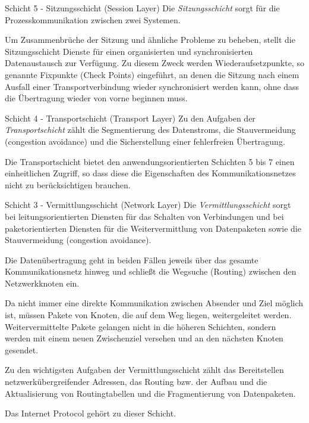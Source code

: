 \begin{defi}{Schicht 5 - Sitzungsschicht (Session Layer)}
    Die \emph{Sitzungsschicht} sorgt für die Prozesskommunikation zwischen zwei Systemen.

    Um Zusammenbrüche der Sitzung und ähnliche Probleme zu beheben, stellt die Sitzungsschicht Dienste für einen organisierten und synchronisierten Datenaustausch zur Verfügung.
    Zu diesem Zweck werden Wiederaufsetzpunkte, so genannte Fixpunkte (Check Points) eingeführt, an denen die Sitzung nach einem Ausfall einer Transportverbindung wieder synchronisiert werden kann, ohne dass die Übertragung wieder von vorne beginnen muss.
\end{defi}

\begin{defi}{Schicht 4 - Transportschicht (Transport Layer)}
    Zu den Aufgaben der \emph{Transportschicht} zählt die Segmentierung des Datenstroms, die Stauvermeidung (congestion avoidance) und die Sicherstellung einer fehlerfreien Übertragung.

    Die Transportschicht bietet den anwendungsorientierten Schichten 5 bis 7 einen einheitlichen Zugriff, so dass diese die Eigenschaften des Kommunikationsnetzes nicht zu berücksichtigen brauchen.
\end{defi}

\begin{defi}{Schicht 3 - Vermittlungsschicht (Network Layer)}
    Die \emph{Vermittlungsschicht} sorgt bei leitungsorientierten Diensten für das Schalten von Verbindungen und bei paketorientierten Diensten für die Weitervermittlung von Datenpaketen sowie die Stauvermeidung (congestion avoidance).

    Die Datenübertragung geht in beiden Fällen jeweils über das gesamte Kommunikationsnetz hinweg und schließt die Wegsuche (Routing) zwischen den Netzwerkknoten ein.

    Da nicht immer eine direkte Kommunikation zwischen Absender und Ziel möglich ist, müssen Pakete von Knoten, die auf dem Weg liegen, weitergeleitet werden.
    Weitervermittelte Pakete gelangen nicht in die höheren Schichten, sondern werden mit einem neuen Zwischenziel versehen und an den nächsten Knoten gesendet.

    Zu den wichtigsten Aufgaben der Vermittlungsschicht zählt das Bereitstellen netzwerkübergreifender Adressen, das Routing bzw. der Aufbau und die Aktualisierung von Routingtabellen und die Fragmentierung von Datenpaketen.

    Das Internet Protocol gehört zu dieser Schicht.
\end{defi}

